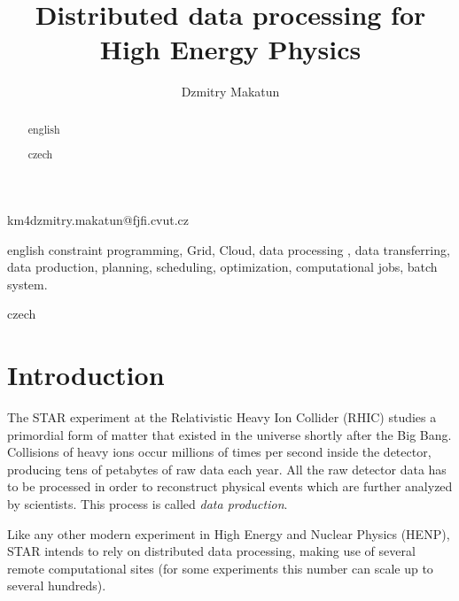 \documentclass[english]{ddny}
\begin{document}
\title{Distributed data processing for High Energy Physics}
\author{Dzmitry Makatun}{km}{4}{dzmitry.makatun@fjfi.cvut.cz}




\maketitle

\begin{abstract}{english}

\end{abstract}

\begin{keywords}{english}
constraint programming, Grid, Cloud, data processing , data transferring, data production, planning, scheduling, optimization, computational jobs, batch system.
\end{keywords}

\begin{abstract}{czech}

\end{abstract}

\begin{keywords}{czech}

\end{keywords}

\tableofcontents


\section{Introduction}
The STAR experiment at the Relativistic Heavy Ion Collider (RHIC) studies a primordial form of matter that existed in the universe shortly after the Big Bang. Collisions of heavy ions occur millions of times per second inside the detector, producing tens of petabytes of raw data each year. All the raw detector data has to be processed in order to reconstruct physical events which are further analyzed by scientists. This process is called \textit{data production}.

Like any other modern experiment in High Energy and Nuclear Physics (HENP), STAR intends to rely on distributed data processing, making use of several remote computational sites (for some experiments this number can scale up to several hundreds).
\end{document}
